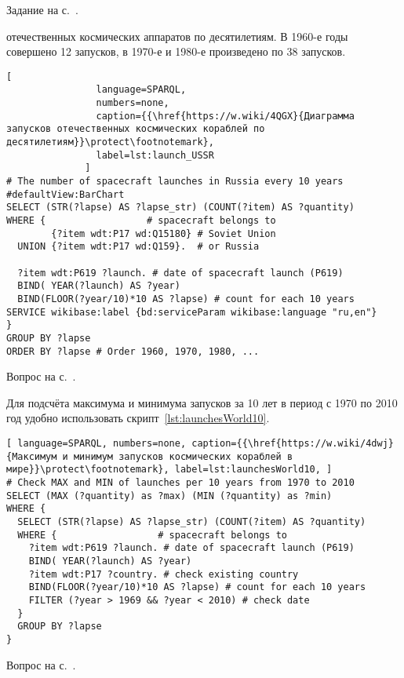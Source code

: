 \begin{task}
\small{Задание на с.~\pageref{question:ship_3}.}
\end{task}


\begin{task}
    \label{answer:launches_USSR}
     отечественных космических аппаратов по десятилетиям.
    В 1960-е годы совершено 12 запусков, в 1970-е и 1980-е произведено по 38 запусков.

    \begin{lstlisting}[ 
                language=SPARQL, 
                numbers=none, 
                caption={{\href{https://w.wiki/4QGX}{Диаграмма запусков отечественных космических кораблей по десятилетиям}}\protect\footnotemark}, 
                label=lst:launch_USSR
              ]
# The number of spacecraft launches in Russia every 10 years
#defaultView:BarChart
SELECT (STR(?lapse) AS ?lapse_str) (COUNT(?item) AS ?quantity)
WHERE {                  # spacecraft belongs to
        {?item wdt:P17 wd:Q15180} # Soviet Union
  UNION {?item wdt:P17 wd:Q159}.  # or Russia
  
  ?item wdt:P619 ?launch. # date of spacecraft launch (P619)
  BIND( YEAR(?launch) AS ?year) 
  BIND(FLOOR(?year/10)*10 AS ?lapse) # count for each 10 years
SERVICE wikibase:label {bd:serviceParam wikibase:language "ru,en"}
} 
GROUP BY ?lapse
ORDER BY ?lapse # Order 1960, 1970, 1980, ...    \end{lstlisting}
    \small{Вопрос на с.~\pageref{question:spacecraft_1}.}
\end{task}

\begin{task}
    \label{answer:launches_world}
    Для подсчёта максимума и минимума запусков за 10 лет в период с 1970 по 2010 год удобно использовать скрипт~\ref{lst:launchesWorld10}.
    \begin{lstlisting}[ language=SPARQL, numbers=none, caption={{\href{https://w.wiki/4dwj}{Максимум и минимум запусков космических кораблей в мире}}\protect\footnotemark}, label=lst:launchesWorld10, ]
# Check MAX and MIN of launches per 10 years from 1970 to 2010
SELECT (MAX (?quantity) as ?max) (MIN (?quantity) as ?min)
WHERE {
  SELECT (STR(?lapse) AS ?lapse_str) (COUNT(?item) AS ?quantity)
  WHERE {                  # spacecraft belongs to
    ?item wdt:P619 ?launch. # date of spacecraft launch (P619)
    BIND( YEAR(?launch) AS ?year) 
    ?item wdt:P17 ?country. # check existing country
    BIND(FLOOR(?year/10)*10 AS ?lapse) # count for each 10 years
    FILTER (?year > 1969 && ?year < 2010) # check date
  } 
  GROUP BY ?lapse
} \end{lstlisting}
    \small{Вопрос на с.~\pageref{question:spacecraft_2}.}
\end{task}

